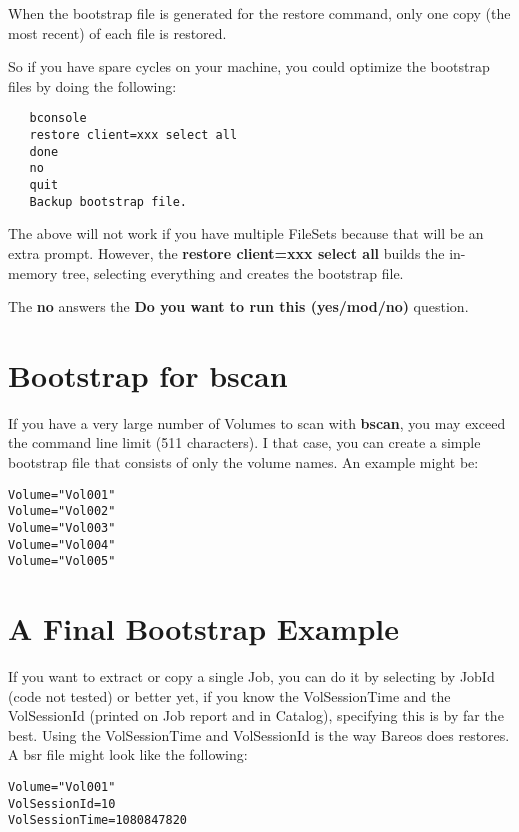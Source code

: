 When the bootstrap file is generated for the restore command, only one copy
(the most recent) of each file is restored.

So if you have spare cycles on your machine, you could optimize the bootstrap
files by doing the following:

\footnotesize
\begin{verbatim}
   bconsole
   restore client=xxx select all
   done
   no
   quit
   Backup bootstrap file.
\end{verbatim}
\normalsize

The above will not work if you have multiple FileSets because that will be an
extra prompt. However, the {\bf restore client=xxx select all} builds the
in-memory tree, selecting everything and creates the bootstrap file.

The {\bf no} answers the {\bf Do you want to run this (yes/mod/no)} question.

\label{bscanBootstrap}
\section{Bootstrap for bscan}

If you have a very large number of Volumes to scan with {\bf bscan},
you may exceed the command line limit (511 characters). I that case,
you can create a simple bootstrap file that consists of only the
volume names.  An example might be:

\footnotesize
\begin{verbatim}
Volume="Vol001"
Volume="Vol002"
Volume="Vol003"
Volume="Vol004"
Volume="Vol005"
\end{verbatim}
\normalsize


\section{A Final Bootstrap Example}


If you want to extract or copy a single Job, you can do it by selecting by
JobId (code not tested) or better yet, if you know the VolSessionTime and the
VolSessionId (printed on Job report and in Catalog), specifying this is by far
the best. Using the VolSessionTime and VolSessionId is the way Bareos does
restores. A bsr file might look like the following:

\footnotesize
\begin{verbatim}
Volume="Vol001"
VolSessionId=10
VolSessionTime=1080847820
\end{verbatim}
\normalsize

